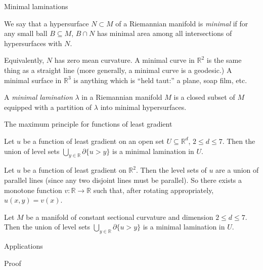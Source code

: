 \documentclass[10pt]{beamer}
\newcommand{\RR}{\mathbb{R}}
\begin{document}
\begin{frame}{Minimal laminations}
\begin{definition}
We say that a hypersurface $N \subset M$ of a Riemannian manifold is \emph{minimal} if for any small ball $B \subseteq M$, $B \cap N$ has minimal area among all intersections of hypersurfaces with $N$.
\end{definition}

Equivalently, $N$ has zero mean curvature. A minimal curve in $\RR^2$ is the same thing as a straight line (more generally, a minimal curve is a geodesic.)
A minimal surface in $\RR^3$ is anything which is ``held taut:'' a plane, soap film, etc.

\begin{definition}
A \emph{minimal lamination} $\lambda$ in a Riemannian manifold $M$ is a closed subset of $M$ equipped with a partition of $\lambda$ into minimal hypersurfaces.
\end{definition}
\end{frame}

\begin{frame}{The maximum principle for functions of least gradient}
\begin{theorem}
Let $u$ be a function of least gradient on an open set $U \subseteq \RR^d$, $2 \leq d \leq 7$.
Then the union of level sets $\bigcup_{y \in \RR} \partial\{u > y\}$ is a minimal lamination in $U$.
\end{theorem}

\begin{example}
Let $u$ be a function of least gradient on $\RR^2$. Then the level sets of $u$ are a union of parallel lines (since any two disjoint lines must be parallel).
So there exists a monotone function $v: \RR \to \RR$ such that, after rotating appropriately, $u(x, y) = v(x)$.
\end{example}

\begin{theorem}[-- '22]
Let $M$ be a manifold of constant sectional curvature and dimension $2 \leq d \leq 7$.
Then the union of level sets $\bigcup_{y \in \RR} \partial\{u > y\}$ is a minimal lamination in $U$.
\end{theorem}

\end{frame}

\begin{frame}{Applications}
    
\end{frame}

\begin{frame}{Proof}
    
\end{frame}
\end{document}
